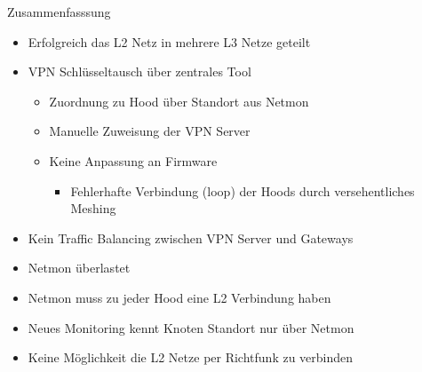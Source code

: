 \begin{frame}{Zusammenfasssung}
    \begin{itemize}
        \item Erfolgreich das L2 Netz in mehrere L3 Netze geteilt
        \item VPN Schlüsseltausch über zentrales Tool
        \begin{itemize}
            \item Zuordnung zu Hood über Standort aus Netmon
            \item Manuelle Zuweisung der VPN Server
            \item Keine Anpassung an Firmware
            \begin{itemize}
                \item Fehlerhafte Verbindung (loop) der Hoods durch versehentliches Meshing
            \end{itemize}
        \end{itemize}
        \item Kein Traffic Balancing zwischen VPN Server und Gateways
        \item Netmon überlastet
        \item Netmon muss zu jeder Hood eine L2 Verbindung haben
        \item Neues Monitoring kennt Knoten Standort nur über Netmon
        \item Keine Möglichkeit die L2 Netze per Richtfunk zu verbinden
    \end{itemize}
\end{frame}
